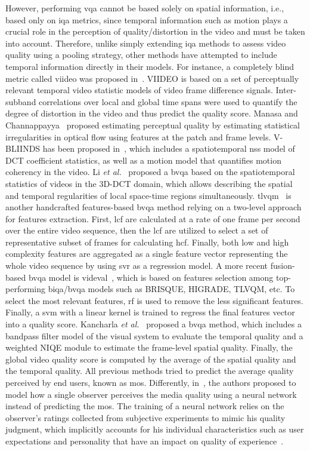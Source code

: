 \documentclass[journal]{IEEEtran}
\begin{document}
However, performing \ac{vqa} cannot be based solely on spatial information, i.e., based only on \ac{iqa} metrics, since temporal information such as motion plays a crucial role in the perception of quality/distortion in the video and must be taken into account. Therefore, unlike simply extending \ac{iqa} methods to assess video quality using a pooling strategy, other methods have attempted to include temporal information directly in their models. For instance, a completely blind metric called \ac{viideo} was proposed in~\cite{mittal2015completely}. VIIDEO is based on a set of perceptually relevant temporal video statistic models of video frame difference signals. Inter-subband correlations over local and global time spans were used to quantify the degree of distortion in the video and thus predict the quality score. Manasa and Channappayya~\cite{manasa2016optical} proposed estimating perceptual quality by estimating statistical irregularities in optical flow using features at the patch and frame levels. V-BLIINDS has been proposed in~\cite{saad2014blind}, which includes a spatiotemporal \ac{nss} model of DCT coefficient statistics, as well as a motion model that quantifies motion coherency in the video. Li \textit{et al.}~\cite{li2016spatiotemporal} proposed a \ac{bvqa} based on the spatiotemporal statistics of videos in the 3D-DCT domain, which allows describing the spatial and temporal regularities of local space-time regions simultaneously. \Ac{tlvqm}~\cite{korhonen2019two} is another handcrafted features-based \ac{bvqa} method relying on a two-level approach for features extraction. First, \ac{lcf} are calculated at a rate of one frame per second over the entire video sequence, then the \acs{lcf} are utilized to select a set of representative subset of frames for calculating \ac{hcf}. Finally, both low and high complexity features are aggregated as a single feature vector representing the whole video sequence by using  \ac{svr} as a regression model. A more recent fusion-based \ac{bvqa} model is \ac{videval}~\cite{tu2021ugc}, which is based on features selection among top-performing \ac{biqa}/\ac{bvqa} models such as BRISQUE, HIGRADE, TLVQM, etc. To select the most relevant features, \ac{rf} is used to  remove the less significant features. Finally, a \ac{svm} with a linear kernel is trained to regress the final features vector into a quality score. Kancharla \textit{et al.}~\cite{9633248} proposed a \ac{bvqa} method, which includes a bandpass filter model of the visual system to evaluate the temporal quality and a weighted NIQE module to estimate the frame-level spatial quality. Finally, the global video quality score is computed by the average of the spatial quality and the temporal quality. All previous methods tried to predict the average quality perceived by end users, known as \ac{mos}. Differently, in~\cite{tiotsop2022mimicking}, the authors proposed to model how a single observer perceives the media quality using a neural network instead of predicting the \ac{mos}. The training of a neural network relies on the observer's ratings collected from subjective experiments to mimic his quality judgment, which implicitly accounts for his individual characteristics such as user expectations and personality that have an impact on quality of experience~\cite{zhu2018measuring}. 
\end{document}
